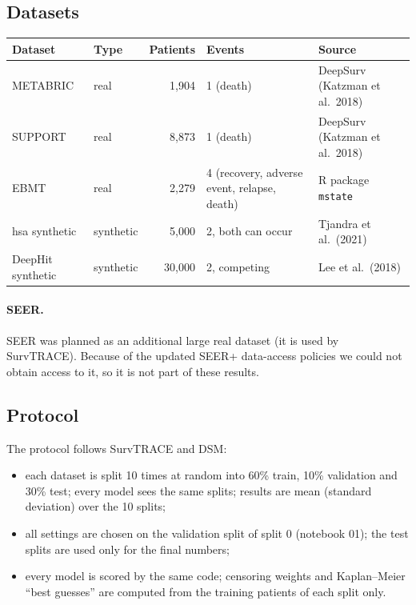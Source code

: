 \documentclass[11pt]{article}
\begin{document}
\subsection{Datasets}
\begin{table}[H]
\centering
\begin{tabular}{llrp{4.6cm}p{3.6cm}}
\toprule
Dataset & Type & Patients & Events & Source \\
\midrule
METABRIC & real & 1,904 & 1 (death) & DeepSurv (Katzman et al.\ 2018) \\
SUPPORT & real & 8,873 & 1 (death) & DeepSurv (Katzman et al.\ 2018) \\
EBMT & real & 2,279 & 4 (recovery, adverse event, relapse, death) & R package \texttt{mstate} \\
hsa synthetic & synthetic & 5,000 & 2, both can occur & Tjandra et al.\ (2021) \\
DeepHit synthetic & synthetic & 30,000 & 2, competing & Lee et al.\ (2018) \\
\bottomrule
\end{tabular}
\end{table}

\paragraph{SEER.} SEER was planned as an additional large real dataset (it is used by SurvTRACE).
Because of the updated SEER+ data-access policies we could not obtain access to it, so it is not part
of these results.

\subsection{Protocol}
The protocol follows SurvTRACE and DSM:
\begin{itemize}
  \item each dataset is split 10 times at random into 60\% train, 10\% validation and 30\% test; every
        model sees the same splits; results are mean (standard deviation) over the 10 splits;
  \item all settings are chosen on the validation split of split 0 (notebook 01); the test splits are
        used only for the final numbers;
  \item every model is scored by the same code; censoring weights and Kaplan--Meier ``best guesses'' are
        computed from the training patients of each split only.
\end{itemize}
\end{document}
